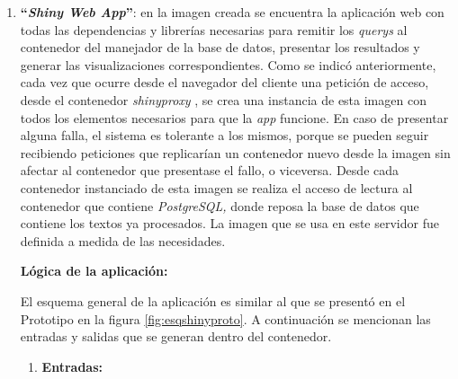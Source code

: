 \documentclass[
  12pt,
  openany]{book}
\begin{document}
\begin{enumerate}
\item
  \textbf{``\emph{Shiny Web App}''}: en la imagen creada se encuentra la aplicación web con todas las dependencias y librerías necesarias para remitir los \emph{querys} al contenedor del manejador de la base de datos, presentar los resultados y generar las visualizaciones correspondientes. Como se indicó anteriormente, cada vez que ocurre desde el navegador del cliente una petición de acceso, desde el contenedor \emph{shinyproxy} , se crea una instancia de esta imagen con todos los elementos necesarios para que la \emph{app} funcione. En caso de presentar alguna falla, el sistema es tolerante a los mismos, porque se pueden seguir recibiendo peticiones que replicarían un contenedor nuevo desde la imagen sin afectar al contenedor que presentase el fallo, o viceversa. Desde cada contenedor instanciado de esta imagen se realiza el acceso de lectura al contenedor que contiene \emph{PostgreSQL,} donde reposa la base de datos que contiene los textos ya procesados. La imagen que se usa en este servidor fue definida a medida de las necesidades.

  \textbf{Lógica de la aplicación:}

  El esquema general de la aplicación es similar al que se presentó en el Prototipo en la figura \ref{fig:esqshinyproto}. A continuación se mencionan las entradas y salidas que se generan dentro del contenedor.

  \begin{enumerate}
  \def\labelenumii{\arabic{enumii}.}
  \item
    \textbf{Entradas:}


\end{enumerate}
\end{enumerate}
\end{document}
